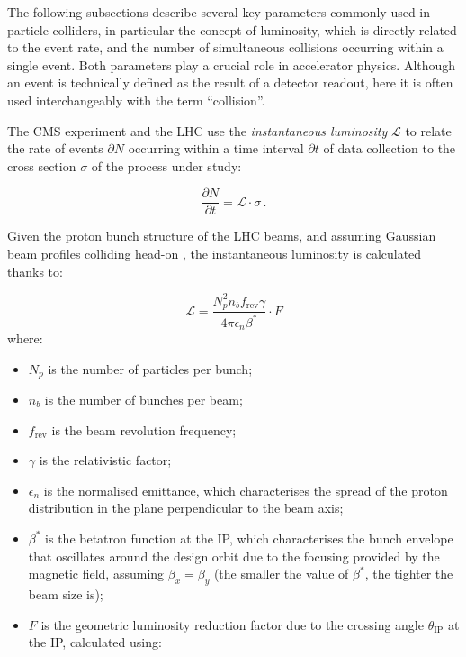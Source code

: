 The following subsections describe several key parameters commonly used in particle colliders, in particular the concept of luminosity, which is directly related to the event rate, and the number of simultaneous collisions occurring within a single event. Both parameters play a crucial role in accelerator physics. Although an event is technically defined as the result of a detector readout, here it is often used interchangeably with the term ``collision''.

\vspace{0.5 cm}

The CMS experiment and the LHC use the \textit{instantaneous luminosity} $\mathscr{L}$ to relate the rate of events $\partial N$ occurring within a time interval $\partial t$ of data collection to the cross section $\sigma$ of the process under study:

\begin{equation}
    \frac{\partial N}{\partial t} = \mathscr{L} \cdot \sigma\, .
    \label{eq:nbrEvent}
\end{equation}

\vspace{0.5 cm}

Given the proton bunch structure of the LHC beams, and assuming Gaussian beam profiles colliding head-on \cite{LumiComputation}, the instantaneous luminosity is calculated thanks to:

\begin{equation}
    \mathscr{L} = \frac{N_p^2n_bf_{\textrm{rev}}\gamma}{4\pi\epsilon_n\beta^{*}} \cdot F
    \label{eq:instantaneous_luminosity}
\end{equation}
where:
\begin{itemize}
    \item $N_p$ is the number of particles per bunch;
    \item $n_b$ is the number of bunches per beam;
    \item $f_{\textrm{rev}}$ is the beam revolution frequency;
    \item $\gamma$ is the relativistic factor;
    \item $\epsilon_n$ is the normalised emittance, which characterises the spread of the proton distribution in the plane perpendicular to the beam axis;
    \item $\beta^{*}$ is the betatron function at the IP, which characterises the bunch envelope that oscillates around the design orbit due to the focusing provided by the magnetic field, assuming $\beta_x=\beta_y$ (the smaller the value of $\beta^{*}$, the tighter the beam size is);
    \item $F$ is the geometric luminosity reduction factor due to the crossing angle $\theta_\textrm{IP}$ at the IP, calculated using:
\end{itemize}

